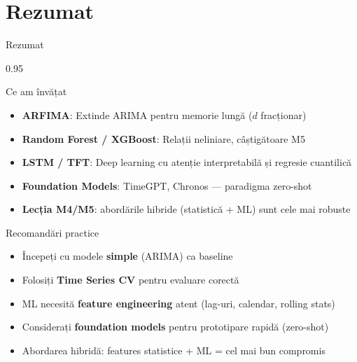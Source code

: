 \documentclass[9pt, aspectratio=169, t]{beamer}
\begin{document}
\section{Rezumat}

\begin{frame}{Rezumat}
    \begin{cminipage}{0.95\textwidth}
        {\small
        \begin{block}{Ce am învățat}
            \begin{itemize}\setlength{\itemsep}{0pt}
                \item \textbf{ARFIMA}: Extinde ARIMA pentru memorie lungă ($d$ fracționar)
                \item \textbf{Random Forest / XGBoost}: Relații neliniare, câștigătoare M5
                \item \textbf{LSTM / TFT}: Deep learning cu atenție interpretabilă și regresie cuantilică
                \item \textbf{Foundation Models}: TimeGPT, Chronos --- paradigma zero-shot
                \item \textbf{Lecția M4/M5}: abordările hibride (statistică + ML) sunt cele mai robuste
            \end{itemize}
        \end{block}

        \begin{alertblock}{Recomandări practice}
            \begin{itemize}\setlength{\itemsep}{0pt}
                \item Începeți cu modele \textbf{simple} (ARIMA) ca baseline
                \item Folosiți \textbf{Time Series CV} pentru evaluare corectă
                \item ML necesită \textbf{feature engineering} atent (lag-uri, calendar, rolling stats)
                \item Considerați \textbf{foundation models} pentru prototipare rapidă (zero-shot)
                \item Abordarea hibridă: features statistice + ML = cel mai bun compromis
            \end{itemize}
        \end{alertblock}
        }
    \end{cminipage}
\end{frame}
\end{document}
